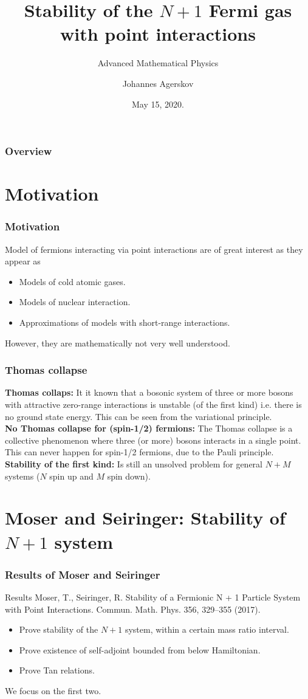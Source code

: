 \documentclass{beamer}[10]
\title{Stability of the $ N+1 $ Fermi gas with point interactions}
\subtitle{Advanced Mathematical Physics}
\author{Johannes Agerskov}
\institute{Institute for Mathematical Sciences \\ University of Copenhagen}
\date{May 15, 2020.}
\begin{document}
\frame{\titlepage \vspace{-0.5cm}
}

\frame
{
\frametitle{Overview}
\linespread{1.5}
\tableofcontents%
}
\section{Motivation}
\begin{frame}
	\frametitle{Motivation}
	Model of fermions interacting via point interactions are of great interest as they appear as
	\begin{itemize}
		\item Models of cold atomic gases.\\
		\item Models of nuclear interaction.\\
		\item Approximations of models with short-range interactions.
	\end{itemize}
	However, they are mathematically not very well understood.
\end{frame}

\begin{frame}
	\frametitle{Thomas collapse}
	\textbf{Thomas collaps:}
	It it known that a bosonic system of three or more bosons with attractive zero-range interactions is unstable (of the first kind) i.e. there is no ground state energy. This can be seen from the variational principle.\\\vspace*{0.5cm}
	\textbf{No Thomas collapse for (spin-1/2) fermions:} The Thomas collapse is a collective phenomenon where three (or more) bosons interacts in a single point. This can never happen for spin-1/2 fermions, due to the Pauli principle.\\\vspace*{0.5cm}
	\textbf{Stability of the first kind:} Is still an unsolved problem for general $ N+M $ systems ($ N $ spin up and $ M $ spin down).
\end{frame}
\section{Moser and Seiringer: Stability of $ N+1 $ system}
\begin{frame}
	\frametitle{Results of Moser and Seiringer}
	\begin{block}{Results}
		\small Moser, T., Seiringer, R. Stability of a Fermionic N + 1 Particle System with Point Interactions. Commun. Math. Phys. 356, 329–355 (2017).\normalsize
		\begin{itemize}
			\item Prove stability of the $ N+1 $ system, within a certain mass ratio interval.
			\item Prove existence of self-adjoint bounded from below Hamiltonian.
			\item Prove Tan relations.
		\end{itemize}
	\end{block}
	We focus on the first two.
\end{frame}
\end{document}
